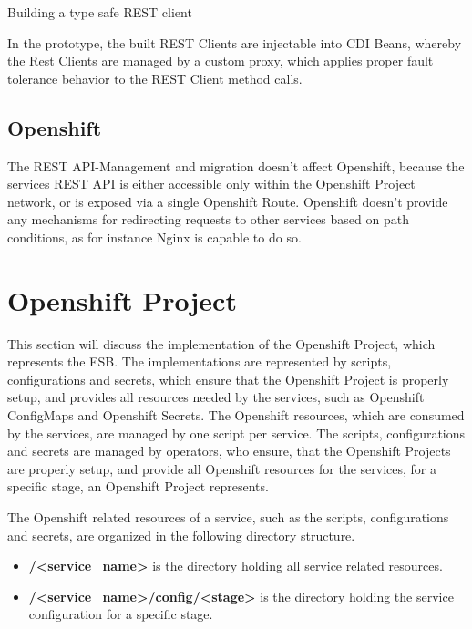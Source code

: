 \begin{listing}[h]
	\caption{Building a type safe REST client}
	\label{ls:esboi-api-client-api-builder-java}
\end{listing}

In the prototype, the built REST Clients are injectable into CDI Beans, whereby the Rest Clients are managed by a custom proxy, which applies proper fault tolerance behavior to the REST Client method calls.

\subsection{Openshift}
\label{sec:esbi-api-openshift}
The REST API-Management and migration doesn't affect Openshift, because the services REST API is either accessible only within the Openshift Project network, or is exposed via a single Openshift Route. Openshift doesn't provide any mechanisms for redirecting requests to other services based on path conditions, as for instance Nginx is capable to do so. 

\section{Openshift Project}
\label{sec:esbi-openshift}
This section will discuss the implementation of the Openshift Project, which represents the ESB. The implementations are represented by scripts, configurations and secrets, which ensure that the Openshift Project is properly setup, and provides all resources needed by the services, such as Openshift ConfigMaps and Openshift Secrets. The Openshift resources, which are consumed by the services, are managed by one script per service. The scripts, configurations and secrets are managed by operators, who ensure, that the Openshift Projects are properly setup, and provide all Openshift resources for the services, for a specific stage, an Openshift Project represents.
\newpage

The Openshift related resources of a service, such as the scripts, configurations and secrets, are organized in the following directory structure.
\begin{itemize}
	\item \textbf{/<service\_name>} is the directory holding all service related resources.
	\item \textbf{/<service\_name>/config/<stage>} is the directory holding the service configuration for a specific stage.
\end{itemize}

